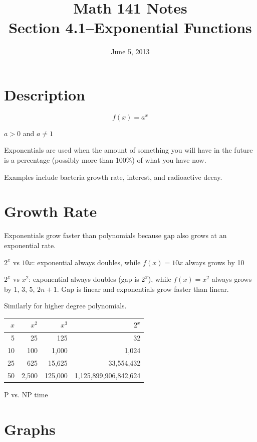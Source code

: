 \documentclass{exam}
\title{Math 141 Notes \\ Section 4.1--Exponential Functions}
\date{June 5, 2013}
\begin{document}
  \maketitle
  \tableofcontents

  \pagebreak

  \section{Description}

  \[
    f(x) = a^x
  \]

    $a > 0$ and $a \neq 1$

  Exponentials are used when the amount of something you will have in the future is a percentage (possibly more than
  100\%) of what you have now.  
  
  Examples include bacteria growth rate, interest, and radioactive decay.

  \section{Growth Rate}
  Exponentials grow faster than polynomials because gap also grows at an exponential rate.

  \begin{itemize*}
    \item $2^x$ vs $10x$: exponential always doubles, while $f(x) = 10x$ always grows by 10
    \item $2^x$ vs $x^2$: exponential always doubles (gap is $2^x$), while $f(x) = x^2$ always grows by 1, 3, 5, $2n +
      1$.  Gap is linear and exponentials grow faster than linear.
    \item Similarly for higher degree polynomials.
  \end{itemize*}

  \begin{tabular}[h]{rrrr}
    \toprule
    $x$ & $x^2$ & $x^3$ & $2^x$ \\
    \midrule
    5  & 25    & 125     & 32 \\
    10 & 100   & 1,000   & 1,024 \\
    25 & 625   & 15,625  & 33,554,432 \\
    50 & 2,500 & 125,000 & 1,125,899,906,842,624 \\
    \bottomrule
  \end{tabular}

  P vs. NP time

  \section{Graphs}
\end{document}
